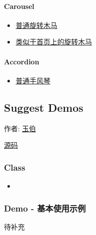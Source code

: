 \documentclass[letterpaper,10pt,english]{sphinxmanual}
\begin{document}
\paragraph{Carousel}
\label{demo/component/switchable/index:carousel}\begin{itemize}
\item {}
\href{http://yiminghe.github.com/kissy/src/switchable/demo/carousel.html\#demo4}{普通旋转木马}

\item {}
\href{http://yiminghe.github.com/kissy/src/switchable/demo/carousel.html\#J\_TinySlide}{类似于首页上的旋转木马}

\end{itemize}


\paragraph{Accordion}
\label{demo/component/switchable/index:accordion}\begin{itemize}
\item {}
\href{http://yiminghe.github.com/kissy/src/switchable/demo/accordion.html}{普通手风琴}

\end{itemize}


\subsection{Suggest Demos}
\label{demo/component/suggest/index:suggest-demos}\label{demo/component/suggest/index::doc}
\begin{DUlineblock}{0em}
\item[] 作者: \href{mailto:lifesinger@gmail.com}{玉伯}
\item[] \href{https://github.com/kissyteam/kissy/tree/master/src/suggest/}{源码}
\end{DUlineblock}


\subsubsection{Class}
\label{demo/component/suggest/index:class}\begin{itemize}
\item {}
{\hyperref[api/component/suggest/index:module-Suggest]{}}

\end{itemize}


\subsubsection{Demo - 基本使用示例}
\label{demo/component/suggest/index:demo}\label{demo/component/suggest/index:component-suggest-demo0}
待补充
\end{document}
